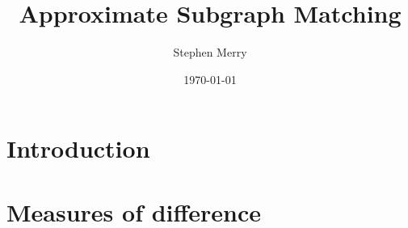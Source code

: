 \documentclass{article}
\title{Approximate Subgraph Matching}
\author{Stephen Merry}
\date{\today}
\begin{document}
\maketitle

\section{Introduction} \label{Introduction}


\section{Measures of difference} \label{Differences}




\end{document}
